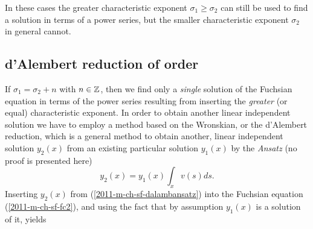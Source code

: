 In these cases the greater characteristic exponent  $\sigma_1 \ge \sigma_2$
can still be used to find a solution in terms of a power series,
but the smaller characteristic exponent $\sigma_2$ in general cannot.

\subsection{d'Alembert reduction of order}



If $\sigma_1=\sigma_2+n$ with $n\in {\Bbb Z}$,
then we find only a {\em single} solution of the Fuchsian equation in terms of the power series resulting
from inserting the {\em greater} (or equal) characteristic exponent.
In order to obtain another linear  independent solution we have to employ
a method based on the Wronskian,\cite[-40mm]{arfken05} or
the
d'Alembert reduction,\cite[-20mm]{Teschl-odr}
which is a general method to obtain another, linear independent solution
$y_2(x)$ from an existing particular solution  $y_1(x)$ by the {\it Ansatz}
(no proof is presented here)
\begin{equation}
y_2(x)=y_1(x)\int_x  v(s) ds.
\label{2011-m-ch-sf-dalambansatz}
\end{equation}
Inserting $y_2(x)$ from (\ref{2011-m-ch-sf-dalambansatz}) into the Fuchsian equation (\ref{2011-m-ch-sf-fc2}),
and using the fact that by assumption $y_1(x)$
is a solution of it,
yields
